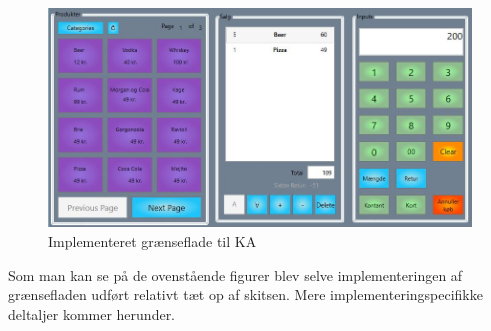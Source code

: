 \begin{figure}[H]
	\centering
	\includegraphics[width=1\textwidth]{Systemdesign/Frontend/pics/GUI}
	\caption{Implementeret grænseflade til \gls{KA}}
	\label{fig:EndeligeGUI}
\end{figure}

Som man kan se på de ovenstående figurer blev selve implementeringen af grænsefladen udført relativt tæt op af skitsen. Mere implementeringspecifikke deltaljer kommer herunder.

\newpage



